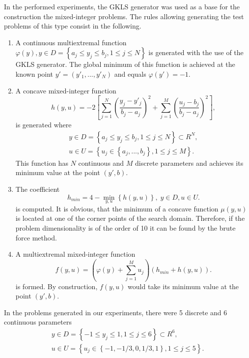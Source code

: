 \documentclass{llncs}
\begin{document}
In the performed experiments, the GKLS generator was used as a base for the construction the 
mixed-integer problems. The rules allowing generating the test problems of this type consist in 
the following.

\begin{enumerate}
	\item A continuous multiextremal function $\varphi(y), y\in D = \left\{ a_j\leq 
y_j\leq b_j, 1\leq j \leq N \right\}$ is generated with the use of the GKLS generator. The global 
minimum of this function is achieved at the known point $y'=(y'_1,...,y'_N)$ and equals 
$\varphi(y')=-1$.
	\item A concave mixed-integer function 
	\[
			h(y,u) = -2 \left[ \sum_{j=1}^N \left( \frac{y_j - y'_j}{b_j-a_j} 
\right)^2 + \sum_{j=1}^M \left( \frac{u_j - b_j}{b_j-a_j} \right)^2 \right],
	\]
	is generated where 
	\begin{gather}
	y\in D = \left\{ a_j\leq y_j\leq b_j, 1\leq j \leq N \right\} \subset R^N,\nonumber \\
	u\in U = \left\{ u_j \in  \left\{a_j, ..., b_j \right\}, 1\leq j \leq M \right\}.\nonumber
	\end{gather}
	This function has $N$ continuous and $M$ discrete parameters and achieves its 
minimum value at the point $(y',b)$.
	\item The coefficient 
	\[
	h_{min} = 4 - \min_{y,u} \left\{ h(y,u) \right\}, \; y\in D, u \in U.
	\]
	is computed. 
It is obvious, that the minimum of a concave function $\mu(y,u)$ is located at one of the corner 
points of the search domain. Therefore, if the problem dimensionality is of the order of 10 it can 
be found by the brute force method.
	\item A multiextremal mixed-integer function 
	\[
	f(y,u) = \left(\varphi(y) + \sum_{j=1}^M{u_j}\right)\left(h_{min} + h(y,u)\right).
	\]
	is formed.
By construction, $f(y,u)$ would take its minimum value at the point $(y',b)$.
	
\end{enumerate}


In the problems generated in our experiments, there were 5 discrete and 6 continuous 
parameters 
	\begin{gather}
	y\in D = \left\{ -1 \leq y_j\leq 1, 1\leq j \leq 6 \right\} \subset R^6,\nonumber \\
	u\in U = \left\{ u_j \in  \left\{-1, -1/3, 0, 1/3, 1 \right\}, 1\leq j \leq 5 \right\}.\nonumber
	\end{gather}
\end{document}
